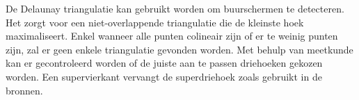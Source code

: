 De Delaunay triangulatie kan gebruikt worden om buurschermen te detecteren. Het zorgt voor een niet-overlappende triangulatie die de kleinste hoek maximaliseert. Enkel wanneer alle punten colineair zijn of er te weinig punten zijn, zal er geen enkele triangulatie gevonden worden. Met behulp van meetkunde kan er gecontroleerd worden of de juiste aan te passen driehoeken gekozen worden. Een supervierkant vervangt de superdriehoek zoals gebruikt in de bronnen. 